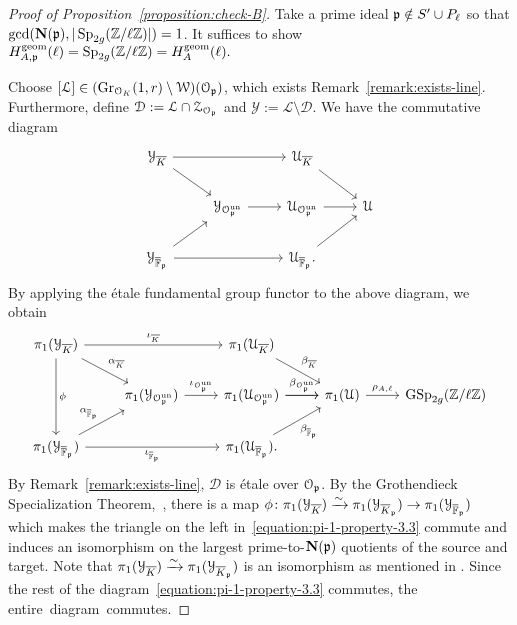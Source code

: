 \begin{proof}[Proof of Proposition~\ref{proposition:check-B}]
Take a prime ideal $\mathfrak{p} \notin S' \cup P_\ell$ so that $\gcd(\mathbf{N}(\mathfrak p), |\operatorname{Sp}_{2g}({\mathbb Z} / \ell {\mathbb Z})|) = 1$.
It suffices to show
$H_{A,\mathfrak p}^{\operatorname{geom}}(\ell) = \operatorname{Sp}_{2g}(\mathbb Z/ \ell \mathbb Z) = H_A^{\operatorname{geom}}(\ell).$

Choose $[\mathcal L] \in (\operatorname{Gr}_{\mathcal O_K}(1,r) \setminus \mathcal W)(\mathcal O_\mathfrak p)$, which exists Remark~\ref{remark:exists-line}. Furthermore, define $\mathcal D := \mathcal L \cap \mathcal Z_{\mathcal O_\mathfrak p}$ and $\mathcal Y := \mathcal L \setminus \mathcal D$.
We have the commutative diagram
	\begin{equation}
		\label{equation:}
		\nonumber
		\begin{tikzcd}
			\mathcal Y_{\overline K} \ar {rr} \ar {dr} & & \mathcal U_{\overline K} \ar {dr} \\
			& \mathcal Y_{\mathcal O_\pp^{\text{un}}} \ar {r} & \mc U_{\OO_\pp^{\on{un}}} \ar{r} & \mathcal U \\
			\mathcal Y_{\overline {{\mathbb F}}_\pp} \ar{ur}\ar{rr} & & \mathcal U_{\overline {{\mathbb F}}_\pp}. \ar{ur}
		\end{tikzcd}\end{equation}
	By applying the \'{e}tale fundamental group functor to the above diagram, we obtain
	\begin{equation}
		\label{equation:pi-1-property-3.3}
		\begin{tikzcd}
			\pi_1(\mathcal Y_{\overline K}) \ar{rr}{\iota_{\overline K}} \ar{dr}{\alpha_{\overline K}} \ar{dd}{\phi} & & \pi_1(\mathcal U_{\overline K}) \ar{dr}{\beta_{\overline K}}& \\
			& \pi_1(\mathcal Y_{\mathcal O_\pp^{\text{un}}}) \ar {r}{\iota_{\mathcal O_\pp^{\text{un}}}} & \pi_1(\mathcal U_{\OO_\pp^{\on{un}}}) \ar{r}{\beta_{\OO_\pp^{\on{un}}}} \ar{r} &  \pi_1(\mathcal U) \ar{r}{\rho_{A,\ell}}& \GSp_{2g}(\mathbb Z/\ell \ZZ)\\
			\pi_1(\mathcal Y_{\overline {{\mathbb F}}_\pp}) \ar{ur}{\alpha_{\overline {{\mathbb F}}_\pp}}\ar[swap]{rr}{\iota_{\overline {{\mathbb F}}_\pp}} & & \pi_1(\mathcal U_{\overline {{\mathbb F}}_\pp}) \ar[swap]{ur}{\beta_{\overline {\FF}_\pp}}. &
		\end{tikzcd}\end{equation}
	By Remark~\ref{remark:exists-line}, $\mathcal D$ is \'etale over $\mathcal O_\mathfrak p$. By the Grothendieck Specialization Theorem,~\cite[Th\'eor\`eme 4.4]{orgogozo2000theoreme},
there is a map
$\phi \colon \pi_1(\mathcal{Y}_{\overline{K}}) \xrightarrow{\sim} \pi_1(\mathcal{Y}_{\overline{K}_\mathfrak p}) \rightarrow \pi_1(\mathcal{Y}_{\overline{{\mathbb F}}_\mathfrak p})$
which makes the triangle on the left in~\eqref{equation:pi-1-property-3.3} commute and induces an isomorphism on the largest prime-to-$\mathbf{N}(\mathfrak p)$ quotients of the source and target.
Note that $\pi_1(\mathcal{Y}_{\overline{K}}) \xrightarrow{\sim} \pi_1(\mathcal{Y}_{\overline{K}_\mathfrak p})$ is an isomorphism as mentioned in
\cite[p.~18]{zywina2010hilbert}.
Since the rest of the diagram~\eqref{equation:pi-1-property-3.3} commutes, the \mbox{entire diagram commutes.}


\end{proof}
